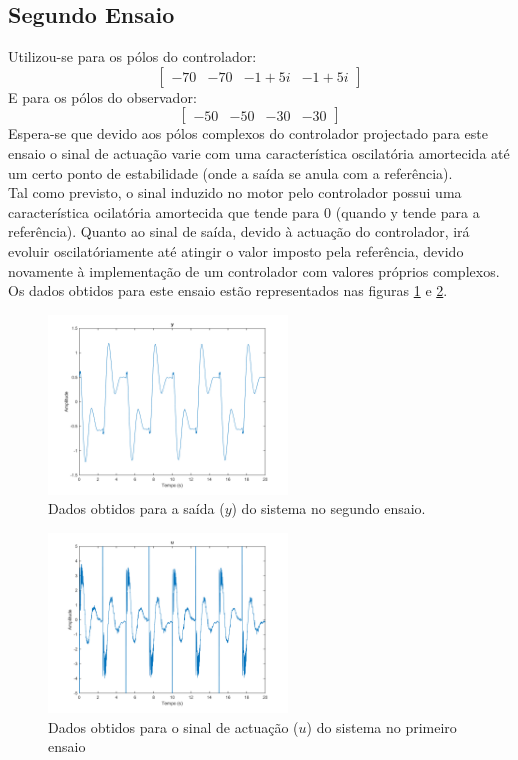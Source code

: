 \documentclass[%
  reprint,
  nofootinbib,
  amsmath,amssymb,
  aps,
  10pt,
  a4paper
]{revtex4-1}
\begin{document}
\subsection{Segundo Ensaio}
Utilizou-se para os pólos do controlador:
\begin{equation}
\begin{bmatrix}
-70 & -70  & -1+5i &-1+5i
\end{bmatrix}
\end{equation}
E para os pólos do observador:
\begin{equation}
\begin{bmatrix}
-50 & -50  & -30 &-30
\end{bmatrix}
\end{equation}
Espera-se que devido aos pólos complexos do controlador projectado para este ensaio o sinal de actuação varie com uma característica oscilatória amortecida até um certo ponto de estabilidade (onde a saída se anula com a referência).\\
Tal como previsto, o sinal induzido no motor pelo controlador possui uma característica ocilatória amortecida que tende para 0 (quando y tende para a referência).
Quanto ao sinal de saída, devido à actuação do controlador, irá evoluir oscilatóriamente até atingir o valor imposto pela referência, devido novamente à implementação de um controlador com valores próprios complexos.
Os dados obtidos para este ensaio estão representados nas figuras \ref{fig:y_seg} e \ref{fig:u_seg}.
\begin{figure}
\includegraphics[width=2.5in]{../imgs/dados_00_c/dados_00_c_y.png}
\caption{Dados obtidos para a saída ($y$) do sistema no segundo ensaio.}
\label{fig:y_seg}
\end{figure}
\begin{figure}
\includegraphics[width=2.5in]{../imgs/dados_00_c/dados_00_c_u.png}
\caption{Dados obtidos para o sinal de actuação ($u$) do sistema no primeiro ensaio}
\label{fig:u_seg}
\end{figure}
\end{document}
